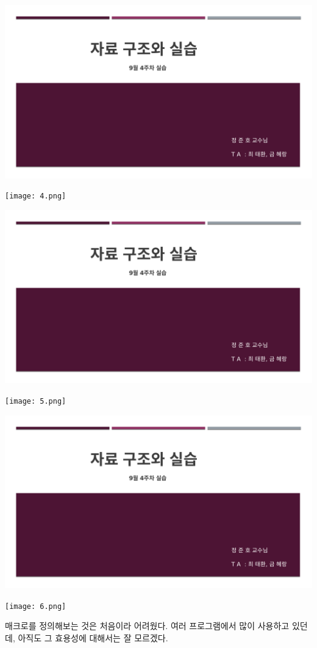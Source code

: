 \documentclass[11pt,a4paper]{article}
\begin{document}
\begin{enumerate}
\includegraphics[page=5, width=\textwidth]{1.pdf}
	
\texttt{[image: 4.png]}	


\includegraphics[page=6, width=\textwidth]{1.pdf}
	
\texttt{[image: 5.png]}	

\includegraphics[page=7, width=\textwidth]{1.pdf}
	
\texttt{[image: 6.png]}	

\end{enumerate}

{}
\indent
매크로를 정의해보는 것은 처음이라 어려웠다. 
여러 프로그램에서 많이 사용하고 있던데, 아직도 그 효용성에 대해서는 잘 모르겠다.
\end{document}
